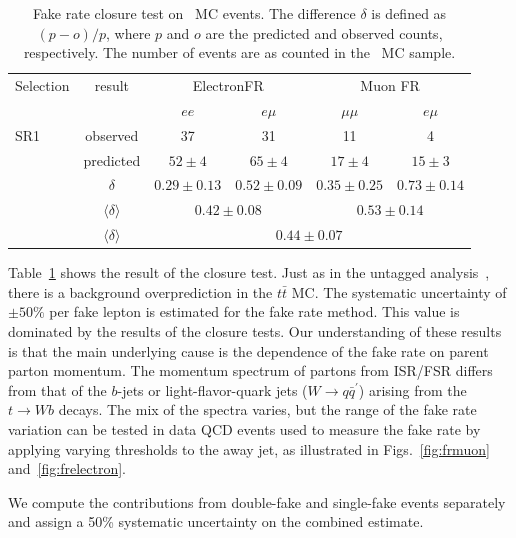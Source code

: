 \begin{table}[h]
\begin{center}
\begin{tabular}{lc|cc|cc}
\hline\hline
Selection	& result	&	\multicolumn{2}{|c}{ElectronFR}		& \multicolumn{2}{|c}{Muon FR}	\\
		&				&	$ee$		& $e\mu$		& $\mu\mu$	& $e\mu$	\\\hline
SR1  	&	observed		& 37			& 31			& 11		& 4		\\
		&predicted			& $52\pm4$		& $65\pm4$		& $17\pm 4$	& $15\pm3$	\\ 
		& $\delta$			& $0.29\pm 0.13$	& $0.52\pm0.09$		& $0.35\pm0.25$	& $0.73\pm0.14$	\\ 
		& $\langle \delta \rangle$	& \multicolumn{2}{|c}{$0.42\pm0.08$}		& \multicolumn{2}{|c}{$0.53\pm0.14$} \\
		& $\langle \delta \rangle$	& 		\multicolumn{4}{|c}{$0.44\pm 0.07$}				\\ \hline
\hline
\end{tabular}
\caption{\label{tab:ttclosure}Fake rate closure test on \ttbar\ MC events.
The difference $\delta$ is defined as $(p-o)/p$, where $p$ and $o$ are the predicted
and observed counts, respectively.
The number of events are as counted in the \ttbar\ MC sample.}
\end{center}
\end{table}

\newcommand{\nNoNu}{\ensuremath{N_{{n}\overline{n}}}}
\newcommand{\nNoNo}{\ensuremath{N_{\overline{n}\overline{n}}}}
\newcommand{\nNuNu}{\ensuremath{N_{{n}{n}}}}

Table~\ref{tab:ttclosure} shows the result of the closure test.  Just as 
in the untagged analysis~\cite{ssnote2011}, there is a background
overprediction in the $t\bar{t}$ MC.
The systematic uncertainty of $\pm 50\%$ per fake lepton is estimated for the fake rate method.
This value is dominated by the results of the closure tests.
Our understanding of these results is that the main underlying cause is 
the dependence of the fake rate on parent parton momentum.
The momentum spectrum of partons from ISR/FSR differs from that of the $b$-jets
or light-flavor-quark jets ($W\to q\bar{q}^\prime$) arising from the $t\to W b$ decays.
The mix of the spectra varies, but the range of the fake rate variation
can be tested in data QCD events used to measure the fake rate
by applying varying thresholds to the away jet, as illustrated in Figs.~\ref{fig:frmuon} and~\ref{fig:frelectron}.

We compute the contributions from double-fake and single-fake events separately and assign a 50\% systematic
uncertainty on the combined estimate.

